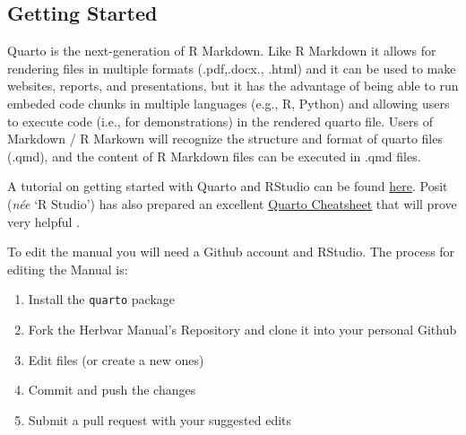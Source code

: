 \documentclass[
  letterpaper,
  DIV=11,
  numbers=noendperiod]{scrreprt}
\providecommand{\tightlist}{%
  \setlength{\itemsep}{0pt}\setlength{\parskip}{0pt}}\usepackage{longtable,booktabs,array}
\begin{document}
\subsection{Getting Started}\label{getting-started}

Quarto is the next-generation of R Markdown. Like R Markdown it allows
for rendering files in multiple formats (.pdf,.docx., .html) and it can
be used to make websites, reports, and presentations, but it has the
advantage of being able to run embeded code chunks in multiple languages
(e.g., R, Python) and allowing users to execute code (i.e., for
demonstrations) in the rendered quarto file. Users of Markdown / R
Markown will recognize the structure and format of quarto files (.qmd),
and the content of R Markdown files can be executed in .qmd files.

\begin{tcolorbox}[enhanced jigsaw, breakable, titlerule=0mm, bottomtitle=1mm, opacityback=0, colframe=quarto-callout-tip-color-frame, toprule=.15mm, opacitybacktitle=0.6, arc=.35mm, bottomrule=.15mm, rightrule=.15mm, toptitle=1mm, leftrule=.75mm, left=2mm, title=\textcolor{quarto-callout-tip-color}{\faLightbulb}\hspace{0.5em}{Tip}, colback=white, coltitle=black, colbacktitle=quarto-callout-tip-color!10!white]

A tutorial on getting started with Quarto and RStudio can be found
\href{https://quarto.org/docs/get-started/hello/rstudio.html}{here}.
Posit (\emph{née} `R Studio') has also prepared an excellent
\href{https://rstudio.github.io/cheatsheets/html/quarto.html}{Quarto
Cheatsheet} that will prove very helpful .

\end{tcolorbox}

To edit the manual you will need a Github account and RStudio. The
process for editing the Manual is:

\begin{enumerate}
\def\labelenumi{\arabic{enumi}.}
\tightlist
\item
  Install the \texttt{quarto} package
\item
  Fork the Herbvar Manual's Repository and clone it into your personal
  Github
\item
  Edit files (or create a new ones)
\item
  Commit and push the changes
\item
  Submit a pull request with your suggested edits
\end{enumerate}
\end{document}
